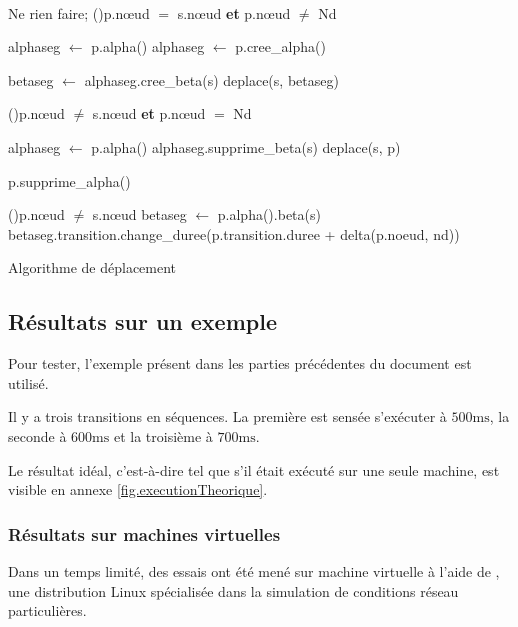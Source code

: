 \begin{algorithm}[H]
	\SetAlgoLined
	
	~ \\
	
	{
		{
			Ne rien faire;	
		}
		\uSinonSi(){p.nœud $=$ s.nœud \textbf{et} p.nœud $\neq$ Nd}
		{
			{
				alphaseg $\longleftarrow$ p.alpha()\;
			}
			\Sinon
			{
				alphaseg $\longleftarrow$ p.cree\_alpha()\;
			}
			
			betaseg $\longleftarrow$ alphaseg.cree\_beta(s)\;
			deplace(s, betaseg)\;
					
		}
		\uSinonSi(){p.nœud $\neq$ s.nœud \textbf{et} p.nœud $=$ Nd}
		{
			alphaseg $\longleftarrow$ p.alpha()\;
			alphaseg.supprime\_beta(s)\;
			deplace(s, p) \;
					
			{
				p.supprime\_alpha()\;
			}		
		}
		\SinonSi(){p.nœud $\neq$ s.nœud}
		{
			betaseg $\longleftarrow$ p.alpha().beta(s)\;
			betaseg.transition.change\_duree(p.transition.duree + delta(p.noeud, nd))\;
		}	
	}
	
	\caption{Algorithme de déplacement}
	\label{alg.deplacement}
\end{algorithm}

\subsection{Résultats sur un exemple}
Pour tester, l'exemple présent dans les parties précédentes du document est utilisé.

Il y a trois transitions en séquences. La première est sensée s'exécuter à $\num{500}\si{\milli\second}$, la seconde à $\num{600}\si{\milli\second}$ et la troisième à $\num{700}\si{\milli\second}$.

Le résultat idéal, c'est-à-dire tel que s'il était exécuté sur une seule machine, est visible en annexe \ref{fig.executionTheorique}.

\subsubsection{Résultats sur machines virtuelles}
Dans un temps limité, des essais ont été mené sur machine virtuelle à l'aide de , une distribution Linux spécialisée dans la simulation de conditions réseau particulières.

